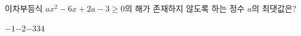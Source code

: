 이차부등식 $ax^2-6x+2a-3\ge 0$의 해가 존재하지 않도록 하는 정수 $a$의 최댓값은?
\begin{choices32}{$-1$}{$-2$}{$-3$}{$3$}{$4$}\end{choices32}
